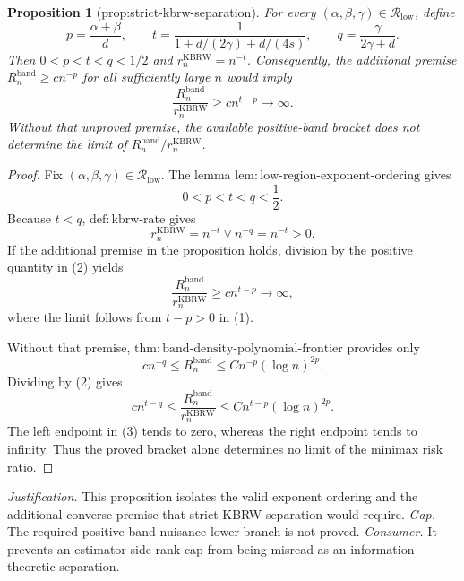 \documentclass{article}
\newtheorem{proposition}{Proposition}
\begin{document}
\begin{proposition}[prop:strict-kbrw-separation]\label{prop:strict-kbrw-separation}
For every \((\alpha,\beta,\gamma)\in\mathcal R_{\mathrm{low}}\), define
\[
p=\frac{\alpha+\beta}{d},\qquad
t=\frac{1}{1+d/(2\gamma)+d/(4s)},\qquad
q=\frac{\gamma}{2\gamma+d}.
\]
Then \(0<p<t<q<1/2\) and \(r_n^{\mathrm{KBRW}}=n^{-t}\).  Consequently, the additional premise \(R_n^{\mathrm{band}}\geq c n^{-p}\) for all sufficiently large \(n\) would imply
\[
\frac{R_n^{\mathrm{band}}}{r_n^{\mathrm{KBRW}}}
\geq c n^{t-p}\longrightarrow\infty.
\]
Without that unproved premise, the available positive-band bracket does not determine the limit of \(R_n^{\mathrm{band}}/r_n^{\mathrm{KBRW}}\).
\end{proposition}
\begin{proof}
Fix \((\alpha,\beta,\gamma)\in\mathcal R_{\mathrm{low}}\).  The lemma
\(\mathrm{lem:low\mbox{-}region\mbox{-}exponent\mbox{-}ordering}\) gives
\[
0<p<t<q<\frac12.
\tag{1}
\]
Because \(t<q\), \(\mathrm{def:kbrw\mbox{-}rate}\) gives
\[
r_n^{\mathrm{KBRW}}=n^{-t}\vee n^{-q}=n^{-t}>0.
\tag{2}
\]
If the additional premise in the proposition holds, division by the positive
quantity in (2) yields
\[
\frac{R_n^{\mathrm{band}}}{r_n^{\mathrm{KBRW}}}
\geq c n^{t-p}\longrightarrow\infty,
\]
where the limit follows from \(t-p>0\) in (1).

Without that premise,
\(\mathrm{thm:band\mbox{-}density\mbox{-}polynomial\mbox{-}frontier}\)
provides only
\[
c n^{-q}\leq R_n^{\mathrm{band}}
\leq Cn^{-p}(\log n)^{2p}.
\]
Dividing by (2) gives
\[
c n^{t-q}\leq
\frac{R_n^{\mathrm{band}}}{r_n^{\mathrm{KBRW}}}
\leq Cn^{t-p}(\log n)^{2p}.
\tag{3}
\]
The left endpoint in (3) tends to zero, whereas the right endpoint tends to
infinity.  Thus the proved bracket alone determines no limit of the minimax
risk ratio.
\end{proof}
\par\smallskip\noindent \textit{Justification.} This proposition isolates the valid exponent ordering and the additional converse premise that strict KBRW separation would require. \textit{Gap.} The required positive-band nuisance lower branch is not proved. \textit{Consumer.} It prevents an estimator-side rank cap from being misread as an information-theoretic separation.
\end{document}
